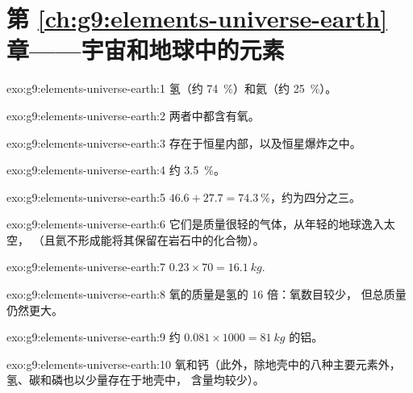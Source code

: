 \section*{第 \ref{ch:g9:elements-universe-earth} 章——宇宙和地球中的元素}

\begin{solution}{exo:g9:elements-universe-earth:1}
氢（约 \qty{74}{\percent}）和氦（约
\qty{25}{\percent}）。
\end{solution}

\begin{solution}{exo:g9:elements-universe-earth:2}
两者中都含有氧。
\end{solution}

\begin{solution}{exo:g9:elements-universe-earth:3}
存在于恒星内部，以及恒星爆炸之中。
\end{solution}

\begin{solution}{exo:g9:elements-universe-earth:4}
约 \qty{3.5}{\percent}。
\end{solution}

\begin{solution}{exo:g9:elements-universe-earth:5}
$46.6 + 27.7 = \qty{74.3}{\percent}$，约为四分之三。
\end{solution}

\begin{solution}{exo:g9:elements-universe-earth:6}
它们是质量很轻的气体，从年轻的地球逸入太空，
（且氦不形成能将其保留在岩石中的化合物）。
\end{solution}

\begin{solution}{exo:g9:elements-universe-earth:7}
$0.23 \times 70 = \qty{16.1}{kg}$.
\end{solution}

\begin{solution}{exo:g9:elements-universe-earth:8}
氧的质量是氢的 16 倍：氧数目较少，
但总质量仍然更大。
\end{solution}

\begin{solution}{exo:g9:elements-universe-earth:9}
约 $0.081 \times 1000 = \qty{81}{kg}$ 的铝。
\end{solution}

\begin{solution}{exo:g9:elements-universe-earth:10}
氧和钙（此外，除地壳中的八种主要元素外，
氢、碳和磷也以少量存在于地壳中，
含量均较少）。
\end{solution}


